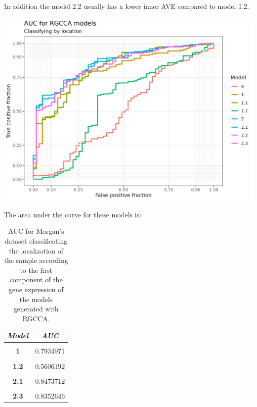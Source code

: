 \documentclass[
  12pt,
  a4paper,
  twoside,
  openright]{book}
\let\origfigure\figure
\let\endorigfigure\endfigure
\renewenvironment{figure}[1][2] {
    \expandafter\origfigure\expandafter[!ht]
} {
    \endorigfigure
}
\begin{document}
In addition the model 2.2 usually has a lower inner AVE compared to model 1.2.

\begin{figure}
\includegraphics[width=1\linewidth]{images/morgan-auc} \caption[AUC plot for Morgan's dataset]{AUC for Morgan's dataset classificating the localization of the sample according to the first component of the gene expression of the models generated with RGCCA.}\label{fig:morgan-auc-plot}
\end{figure}

The area under the curve for these models is:

\begin{table}[H]

\caption[AUC for Morgan's dataset]{\label{tab:morgan-auc}AUC for Morgan's dataset classificating the localization of the sample according to the first component of the gene expression of the models generated with RGCCA.}
\centering
\begin{tabular}[t]{|>{}c|>{}c|}
\hline
\em{\textbf{Model}} & \em{\textbf{AUC}}\\
\hline
\textbf{\cellcolor{gray!6}{0}} & \cellcolor{gray!6}{0.4969734}\\
\hline
\textbf{1} & 0.7934971\\
\hline
\textbf{\cellcolor{gray!6}{1.1}} & \cellcolor{gray!6}{0.8161536}\\
\hline
\textbf{1.2} & 0.5606192\\
\hline
\textbf{\cellcolor{gray!6}{2}} & \cellcolor{gray!6}{0.8546351}\\
\hline
\textbf{2.1} & 0.8473712\\
\hline
\textbf{\cellcolor{gray!6}{2.2}} & \cellcolor{gray!6}{0.8352646}\\
\hline
\textbf{2.3} & 0.8352646\\
\hline
\end{tabular}
\end{table}
\end{document}
